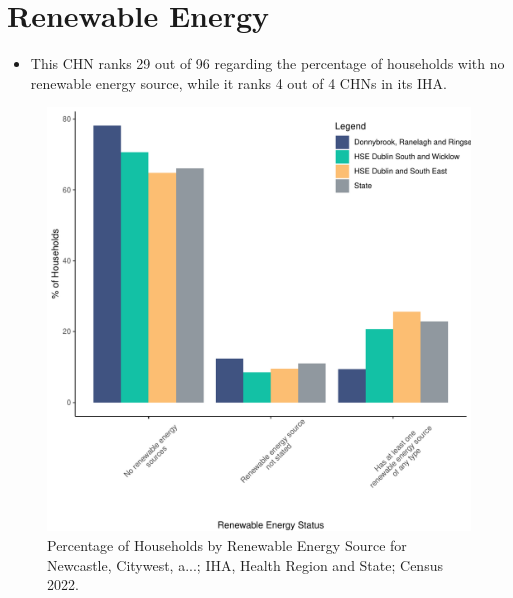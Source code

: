 \documentclass{article}
\begin{document}
\section{Renewable Energy}\label{sect:RE}
\begin{itemize}
\item This CHN ranks  29 out of 96 regarding the percentage of households with no renewable energy source, while it ranks   4 out of 4 CHNs in its IHA.
\end{itemize}
\begin{figure}[H]
	\centering
	\includegraphics[width = 140mm]{../figures/RenewableEnergyED.pdf}
	\caption{Percentage of Households by Renewable Energy Source for Newcastle, Citywest, a...; IHA, Health Region and State; Census 2022.}
	\label{fig:vbnv}
	\end{figure}
\end{document}
